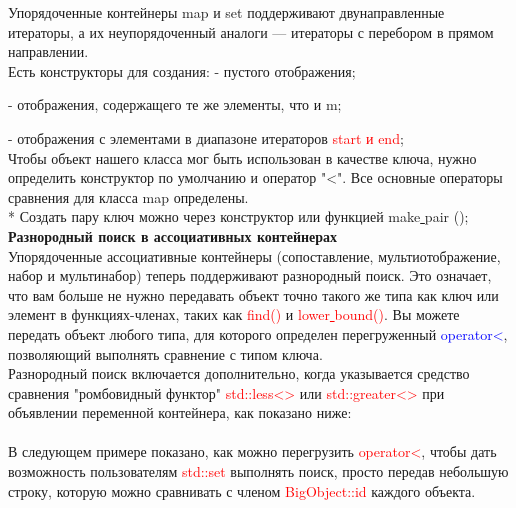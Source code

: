 \documentclass[a4paper,10pt]{article}
\begin{document}
Упорядоченные контейнеры map и set поддерживают двунаправленные итераторы, а их неупорядоченный аналоги — итераторы с перебором в прямом направлении.
\\

Есть конструкторы для создания:
	- пустого отображения;
	
	- отображения, содержащего те же элементы, что и m;
	
	- отображения с элементами в диапазоне итераторов \textcolor{red}{start и end};
	\\

Чтобы объект нашего класса мог быть использован в качестве ключа, нужно определить конструктор по умолчанию и оператор "<". Все основные операторы сравнения для класса map определены.
\\

* Создать пару ключ можно через конструктор или функцией make\underline{ }pair ();
\\

\textbf{Разнородный поиск в ассоциативных контейнерах}
\\


Упорядоченные ассоциативные контейнеры (сопоставление, мультиотображение, набор и мультинабор) теперь поддерживают разнородный поиск. Это означает, что вам больше не нужно передавать объект точно такого же типа как ключ или элемент в функциях-членах, таких как \textcolor{red}{find()} и \textcolor{red}{lower\underline{ }bound()}. Вы можете передать объект любого типа, для которого определен перегруженный \textcolor{blue}{operator<}, позволяющий выполнять сравнение с типом ключа.
\\

Разнородный поиск включается дополнительно, когда указывается средство сравнения "ромбовидный функтор" \textcolor{red}{std::less<>} или \textcolor{red}{std::greater<>} при объявлении переменной контейнера, как показано ниже:
\\

\\

В следующем примере показано, как можно перегрузить \textcolor{red}{operator<}, чтобы дать возможность пользователям \textcolor{red}{std::set} выполнять поиск, просто передав небольшую строку, которую можно сравнивать с членом \textcolor{red}{BigObject::id} каждого объекта.
\\
\end{document}
